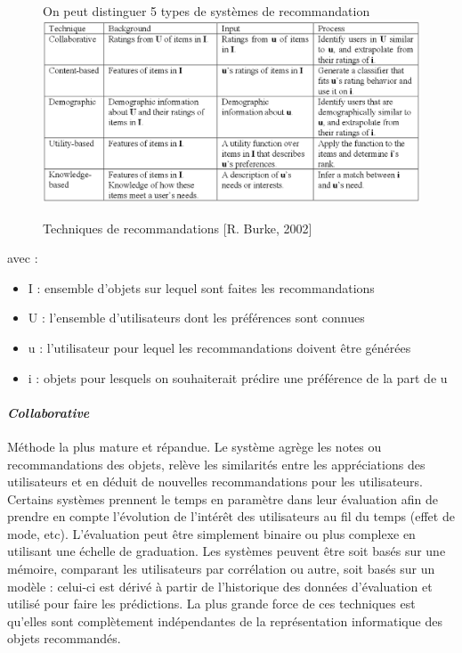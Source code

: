 	\paragraph{}
\begin{figure}[hbtp]
	\centering
	On peut distinguer 5 types de systèmes de recommandation
	\includegraphics[width=1\linewidth]{images/types_recommandation.png}
	\caption{Techniques de recommandations [R. Burke, 2002] \cite{Burk02} }
	\label{types_recommandation}
\end{figure}    
avec :
\begin{itemize}
	\item I : ensemble d’objets sur lequel sont faites les recommandations
	\item U : l’ensemble d’utilisateurs dont les préférences sont connues
	\item u : l’utilisateur pour lequel les recommandations doivent être générées
	\item i : objets pour lesquels on souhaiterait prédire une préférence de la part de u
\end{itemize} 

		\paragraph{\emph{Collaborative} \\ \quad}
Méthode la plus mature et répandue. Le système agrège les notes ou recommandations des objets, relève les similarités entre les appréciations des utilisateurs et en déduit de nouvelles recommandations pour les utilisateurs. Certains systèmes prennent le temps en paramètre dans leur évaluation afin de prendre en compte l’évolution de l’intérêt des utilisateurs au fil du temps (effet de mode, etc). L’évaluation peut être simplement binaire ou plus complexe en utilisant une échelle de graduation. Les systèmes peuvent être soit basés sur une mémoire, comparant les utilisateurs par corrélation ou autre, soit basés sur un modèle :  celui-ci est dérivé à partir de l'historique des données d'évaluation et utilisé pour faire les prédictions.
La plus grande force de ces techniques est qu’elles sont complètement indépendantes de la représentation informatique des objets recommandés.

